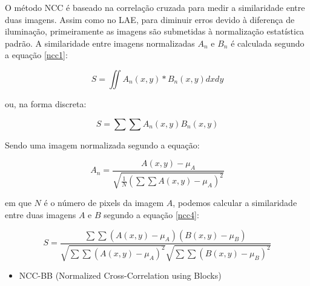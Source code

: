 O método NCC é baseado na correlação cruzada para medir a similaridade entre duas imagens. Assim como no LAE, para diminuir erros devido à diferença de iluminação, primeiramente as imagens são submetidas à normalização estatística padrão. A similaridade entre imagens normalizadas $A_n$ e $B_n$ é calculada segundo a equação \ref{ncc1}:

\begin{equation}
S = \iint A_n(x,y)*B_n(x,y) dx dy \label{ncc1} 
\end{equation}

ou, na forma discreta:

\begin{equation}
S = \sum \sum A_n(x,y)B_n(x,y) \label{ncc2} 
\end{equation} 


Sendo uma imagem normalizada segundo a equação:

\begin{equation}
A_n = \frac {A(x,y) - \mu_A}{\sqrt {\frac{1}{N}(\sum \sum {A(x,y)-\mu_A})^2}} \label{ncc3} 
\end{equation} 

em que $N$ é o número de pixels da imagem $A$, podemos calcular a similaridade entre duas imagens $A$ e $B$ segundo a equação \ref{ncc4}:

\begin{equation}
S = \frac{\sum \sum (A(x,y)-\mu _A)(B(x,y)-\mu _B)}{\sqrt{\sum \sum (A(x,y)-\mu _A)^2}\sqrt{\sum \sum (B(x,y)-\mu _B)^2}}
\label{ncc4}
\end{equation}

\begin{itemize}
\item NCC-BB (Normalized Cross-Correlation using Blocks)
\end{itemize}

